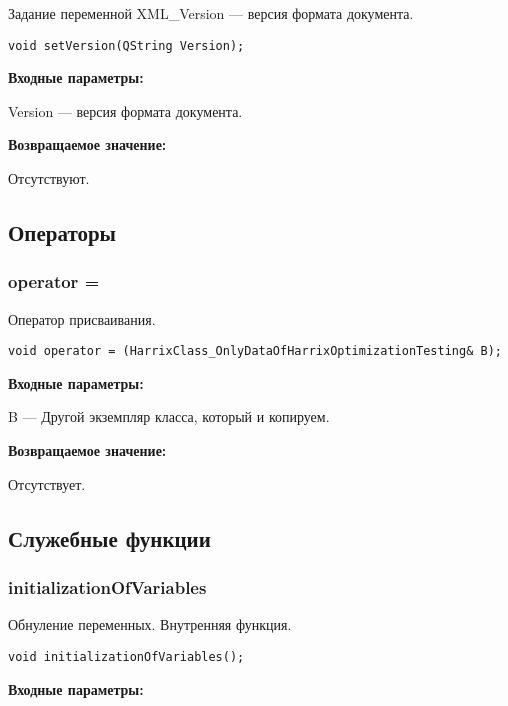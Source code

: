 \documentclass[a4paper,12pt]{article}
\begin{document}
Задание переменной XML\_Version --- версия формата документа.


\begin{lstlisting}[label=code_syntax_setVersion,caption=Синтаксис]
void setVersion(QString Version);
\end{lstlisting}

\textbf{Входные параметры:}

Version --- версия формата документа.

\textbf{Возвращаемое значение:}

Отсутствуют.


\subsection{Операторы}

\subsubsection{operator =}\label{operator =}

Оператор присваивания.


\begin{lstlisting}[label=code_syntax_operator =,caption=Синтаксис]
void operator = (HarrixClass_OnlyDataOfHarrixOptimizationTesting& B);
\end{lstlisting}

\textbf{Входные параметры:}

B --- Другой экземпляр класса, который и копируем.

\textbf{Возвращаемое значение:}

Отсутствует.


\subsection{Служебные функции}

\subsubsection{initializationOfVariables}\label{initializationOfVariables}

Обнуление переменных. Внутренняя функция.


\begin{lstlisting}[label=code_syntax_initializationOfVariables,caption=Синтаксис]
void initializationOfVariables();
\end{lstlisting}

\textbf{Входные параметры:}
\end{document}
